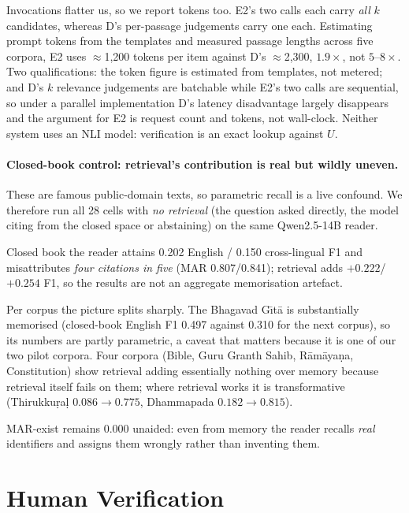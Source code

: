 \documentclass[11pt]{article}
\begin{document}
Invocations flatter us, so we report tokens too. E2's two calls
each carry \emph{all} $k$ candidates, whereas D's per-passage judgements carry
one each. Estimating prompt tokens from the templates and measured passage
lengths across five corpora, E2 uses $\approx$1{,}200 tokens per item against
D's $\approx$2{,}300, \textbf{$1.9\times$}, not $5$--$8\times$. Two qualifications: the token figure is estimated from templates, not metered;
and D's $k$ relevance judgements are batchable while E2's two calls are
sequential, so under a parallel implementation D's latency disadvantage largely
disappears and the argument for E2 is request count and tokens, not
wall-clock. Neither system uses an NLI model:
verification is an exact lookup against $U$.

\paragraph{Closed-book control: retrieval's contribution is real but wildly
uneven.} These are famous public-domain texts, so parametric recall is a live confound.
We therefore run all 28 cells with \emph{no retrieval} (the question asked
directly, the model citing from the closed space or abstaining) on the same
Qwen2.5-14B reader.

Closed book the reader attains 0.202 English / 0.150 cross-lingual F1 and
misattributes \emph{four citations in five} (MAR 0.807/0.841); retrieval adds
$+0.222$/$+0.254$ F1, so the results are not an aggregate memorisation
artefact.

Per corpus the picture splits sharply. The Bhagavad G\={\i}t\={a} is
substantially memorised (closed-book English F1 0.497 against 0.310 for the next
corpus), so its numbers are partly parametric, a caveat that matters because it
is one of our two pilot corpora. Four corpora (Bible, Guru Granth Sahib,
R\={a}m\={a}ya\d{n}a, Constitution) show retrieval adding essentially nothing
over memory because retrieval itself fails on them; where retrieval works it is
transformative (Thirukku\d{r}a\d{l} $0.086 \!\to\! 0.775$, Dhammapada
$0.182 \!\to\! 0.815$).

MAR-exist remains 0.000 unaided: even from memory the reader recalls
\emph{real} identifiers and assigns them wrongly rather than inventing them.

\section{Human Verification}
\label{sec:agreement}
\end{document}
